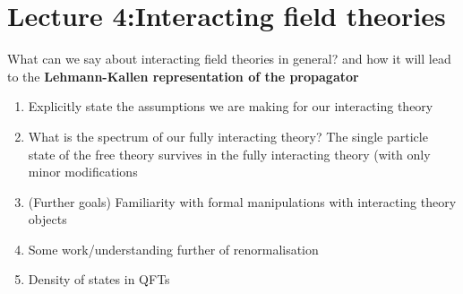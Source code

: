 \section{Lecture 4:Interacting field theories}
What can we say about interacting field theories in general? and how it will lead to the \textbf{Lehmann-Kallen representation of the propagator
}
\begin{enumerate}
    \item Explicitly state the assumptions we are making for our interacting theory
    
    \item What is the spectrum of our fully interacting theory? The single particle state of the free theory survives in the fully interacting theory (with only minor modifications
    \item (Further goals) Familiarity with formal manipulations with interacting theory objects
    \item Some work/understanding further of renormalisation
    \item Density of states in QFTs
\end{enumerate}


